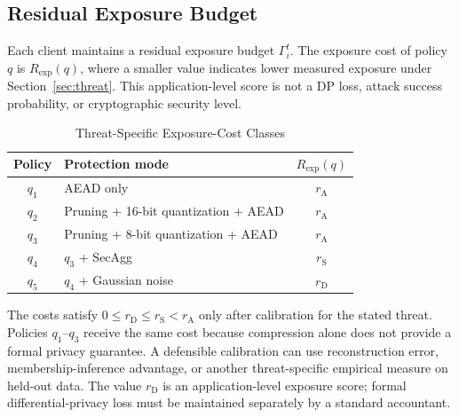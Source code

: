 \documentclass[preprint,12pt]{elsarticle}
\begin{document}
\subsection{Residual Exposure Budget}
\label{sec:exposure_budget}

Each client maintains a residual exposure budget $\Gamma_i^t$. The exposure cost of policy $q$ is $R_{\mathrm{exp}}(q)$, where a smaller value indicates lower measured exposure under Section~\ref{sec:threat}. This application-level score is not a DP loss, attack success probability, or cryptographic security level.

\begin{table}[t]
	\centering
	\caption{Threat-Specific Exposure-Cost Classes}
	\label{tab:risk_cost}
	\scriptsize
	\setlength{\tabcolsep}{3pt}
	\renewcommand{\arraystretch}{1.12}
	\begin{tabular}{c >{\raggedright\arraybackslash}p{} c}
		\hline
		Policy & Protection mode & $R_{\mathrm{exp}}(q)$ \\
		\hline
		$q_1$ & AEAD only & $r_{\mathrm{A}}$ \\
		$q_2$ & Pruning + 16-bit quantization + AEAD & $r_{\mathrm{A}}$ \\
		$q_3$ & Pruning + 8-bit quantization + AEAD & $r_{\mathrm{A}}$ \\
		$q_4$ & $q_3$ + SecAgg & $r_{\mathrm{S}}$ \\
		$q_5$ & $q_4$ + Gaussian noise & $r_{\mathrm{D}}$ \\
		\hline
	\end{tabular}
\end{table}



The costs satisfy $0\leq r_{\mathrm{D}}\leq r_{\mathrm{S}}<r_{\mathrm{A}}$ only after calibration for the stated threat. Policies $q_1$--$q_3$ receive the same cost because compression alone does not provide a formal privacy guarantee. A defensible calibration can use reconstruction error, membership-inference advantage, or another threat-specific empirical measure on held-out data. The value $r_{\mathrm{D}}$ is an application-level exposure score; formal differential-privacy loss must be maintained separately by a standard accountant.
\end{document}
